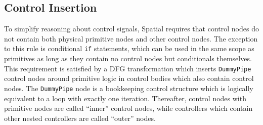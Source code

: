 {%



\subsection{Control Insertion}

To simplify reasoning about control signals, Spatial requires that control nodes do not contain both physical primitive nodes and other control nodes. The exception to this rule is conditional \texttt{\small{if}} statements, which can be used in the same scope as primitives as long as they contain no control nodes but conditionals themselves.
This requirement is satisfied by a DFG transformation which inserts \texttt{\small{DummyPipe}} control nodes around primitive logic in control bodies which also contain control nodes. The \texttt{\small{DummyPipe}} node is a bookkeeping control structure which is logically equivalent to a loop with exactly one iteration.
Thereafter, control nodes with primitive nodes are called ``inner'' control nodes, while controllers which contain other nested controllers are called ``outer'' nodes.

}
